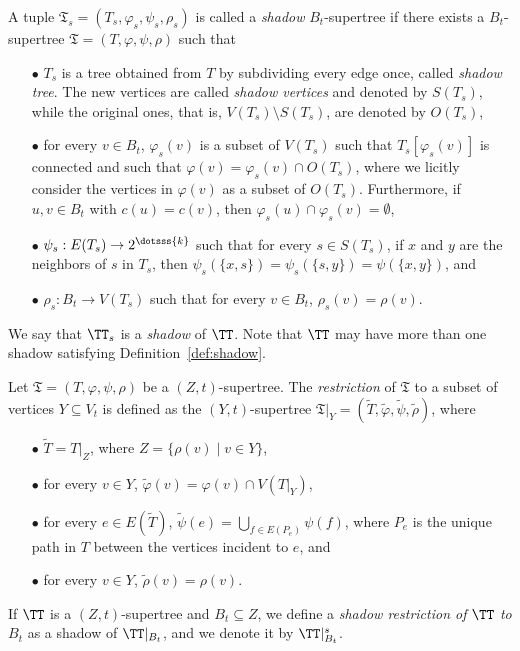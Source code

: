 \begin{definition}\label{def:shadow}
A tuple $\mathfrak{T}_s=(T_s,\varphi_s,\psi_s,\rho_s)$ is called a \emph{shadow} $B_t$-supertree
if there exists a $B_t$-supertree $\mathfrak{T}=(T,\varphi,\psi,\rho)$ such that
\begin{itemize}
\item[$\bullet$] $T_s$ is a tree obtained from $T$ by subdividing every edge once, called \emph{shadow tree}. The new vertices are called \emph{shadow vertices} and denoted by $S(T_s)$, while the original ones, that is, $V(T_s) \setminus S(T_s)$, are denoted by $O(T_s)$,
\item[$\bullet$] for every $v \in B_t$, $\varphi_s(v)$ is a subset of $V(T_s)$ such that $T_s[\varphi_s(v)]$ is connected and such that $\varphi(v) = \varphi_s(v) \cap O(T_s)$, where we licitly consider the vertices in $\varphi(v)$  as a subset of $O(T_s)$. Furthermore, if $u,v \in B_t$ with $c(u) = c(v)$, then $\varphi_s(u) \cap \varphi_s(v) = \emptyset$,
\item[$\bullet$] $\psi_s: E(T_s) \to 2^{\dotsss{k}}$ such that for every $s \in S(T_s)$, if $x$ and $y$ are the neighbors of $s$ in $T_s$, then $\psi_s(\{x,s\}) = \psi_s(\{s,y\}) = \psi(\{x,y\})$, and
\item[$\bullet$] $\rho_s:B_t \to V(T_s)$ such that for every $v \in B_t$, $\rho_s(v) = \rho(v)$.
\end{itemize}
\end{definition}

We say that $\TT_s$ is a \emph{shadow} of $\TT$. Note that $\TT$ may have more than one shadow satisfying Definition~\ref{def:shadow}.

\begin{definition}\label{def:restriction}
Let $\mathfrak{T}=(T,\varphi,\psi,\rho)$ be a $(Z,t)$-supertree. The \emph{restriction} of $\mathfrak{T}$ to a subset of vertices $Y\subseteq V_t$  is defined as the $(Y,t)$-supertree $\mathfrak{T}|_Y=(\tilde{T},\tilde{\varphi},\tilde{\psi},\tilde{\rho})$, where
\begin{itemize}
\item[$\bullet$]  $\tilde{T}=T|_Z$, where $Z=\{\rho(v)\mid v\in Y\}$,
\item[$\bullet$] for every $v \in Y$, $\tilde{\varphi}(v) = \varphi(v) \cap V(T|_{Y})$,
\item[$\bullet$]  for every $ e\in E(\tilde{T})$, $\tilde{\psi}(e) = \bigcup_{f \in E(P_e)} \psi(f)$, where $P_e$ is the unique path in $T$ between the vertices incident to $e$, and
\item[$\bullet$]  for every $ v \in Y$, $\tilde{\rho}(v) = \rho(v)$.
\end{itemize}
If $\TT$ is a $(Z,t)$-supertree and $B_t \subseteq Z$, we define a \emph{shadow restriction of $\TT $ to $B_t$} as a shadow of $\TT|_{B_t}$, and we denote it by
 $\TT|_{B_t}^s$.
 \end{definition}

